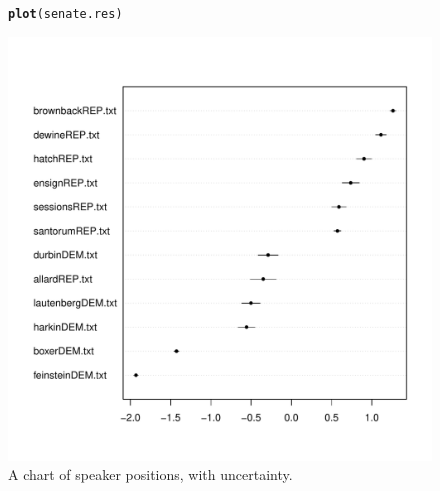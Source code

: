 \documentclass[10pt,a4paper]{article}\usepackage[]{graphicx}\usepackage[]{color}
\makeatletter
\def\maxwidth{ %
  \ifdim\Gin@nat@width>\linewidth
    \linewidth
  \else
    \Gin@nat@width
  \fi
}
\newcommand{\hlstd}[1]{\textcolor[rgb]{0.345,0.345,0.345}{#1}}%
\newcommand{\hlkwd}[1]{\textcolor[rgb]{0.737,0.353,0.396}{\textbf{#1}}}%
\newenvironment{kframe}{%
 \def\at@end@of@kframe{}%
 \ifinner\ifhmode%
  \def\at@end@of@kframe{\end{minipage}}%
  \begin{minipage}{\columnwidth}%
 \fi\fi%
 \def\FrameCommand##1{\hskip\@totalleftmargin \hskip-\fboxsep
 \colorbox{shadecolor}{##1}\hskip-\fboxsep
     \hskip-\linewidth \hskip-\@totalleftmargin \hskip\columnwidth}%
 \MakeFramed {\advance\hsize-\width
   \@totalleftmargin\z@ \linewidth\hsize
   \@setminipage}}%
 {\par\unskip\endMakeFramed%
 \at@end@of@kframe}
\newenvironment{knitrout}{}{} %
\makeatother
\begin{document}
\begin{figure}[htbp]
\begin{center}
\begin{knitrout}
\color{fgcolor}\begin{kframe}
\begin{alltt}
\hlkwd{plot}\hlstd{(senate.res)}
\end{alltt}
\end{kframe}
\includegraphics[width=\maxwidth]{figure/plot-words-1} 

\end{knitrout}
\caption{A chart of speaker positions, with uncertainty.}
\label{senplot}
\end{center}
\end{figure}
\end{document}
